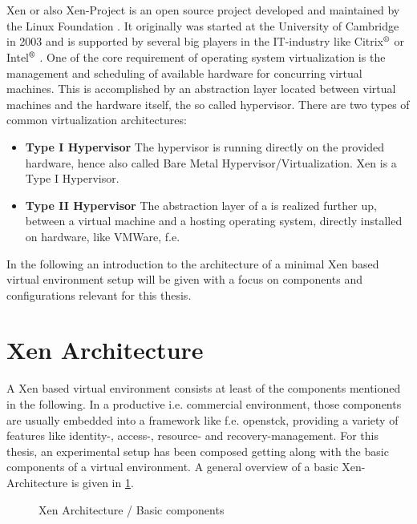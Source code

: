 \\~\\
Xen or also Xen-Project is an open source project developed and maintained by the Linux Foundation
. It originally was started at the University of Cambridge in 2003 and is supported by several 
big players in the IT-industry like Citrix$^\text{\textregistered}$ or Intel$^\text{\textregistered}$ \cite{xenprjct}. One of the core requirement of operating system virtualization is the management and scheduling of available hardware for concurring virtual machines. This is accomplished by an abstraction layer located between virtual machines and the hardware itself, the so called hypervisor. There are two types of common virtualization architectures:

\begin{itemize}
	\item \textbf{Type I Hypervisor} The hypervisor is running directly on the provided hardware, hence also called Bare Metal Hypervisor/Virtualization. Xen is a Type I Hypervisor. 
	\item \textbf{Type II Hypervisor} The abstraction layer of a is realized further up, between a virtual machine and a hosting operating system, directly installed on hardware, like VMWare, f.e. 
\end{itemize}

In the following an introduction to the architecture of a minimal Xen based virtual environment setup will be given with a focus on components and configurations relevant for this thesis. 

\section{Xen Architecture}
A Xen based virtual environment consists at least of the components mentioned in the following. In a productive i.e. commercial environment, those components are usually embedded into a framework like f.e. \gls{openstck}, providing a variety of features like identity-, access-, resource- and recovery-management. For this thesis, an experimental setup has been composed getting along with the basic components of a virtual environment. A general overview of a basic Xen-Architecture is given in \ref{fig:xen-arch}.

\begin{figure}[H]
	\centering
	
	\caption{Xen Architecture / Basic components} \label{fig:xen-arch}
\end{figure}


